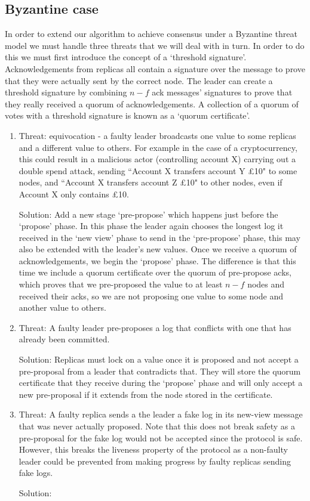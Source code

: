 \subsection{Byzantine case}
In order to extend our algorithm to achieve consensus under a Byzantine threat model we must handle three threats that we will deal with in turn. In order to do this we must first introduce the concept of a `threshold signature'. Acknowledgements from replicas all contain a signature over the message to prove that they were actually sent by the correct node. The leader can create a threshold signature by combining $n - f $ ack messages' signatures to prove that they really received a quorum of acknowledgements. A collection of a quorum of votes with a threshold signature is known as a `quorum certificate'.

\begin{enumerate}
\item Threat: equivocation - a faulty leader broadcasts one value to some replicas and a different value to others. For example in the case of a cryptocurrency, this could result in a malicious actor (controlling account X) carrying out a double spend attack, sending ``Account X transfers account Y £10" to some nodes, and ``Account X transfers account Z £10" to other nodes, even if Account X only contains £10.

Solution: Add a new stage `pre-propose' which happens just before the `propose' phase. In this phase the leader again chooses the longest log it received in the `new view' phase to send in the `pre-propose' phase, this may also be extended with the leader's new values. Once we receive a quorum of acknowledgements, we begin the `propose' phase. The difference is that this time we include a quorum certificate over the quorum of pre-propose acks, which proves that we pre-proposed the value to at least $n - f$ nodes and received their acks, so we are not proposing one value to some node and another value to others.

\item Threat: A faulty leader pre-proposes a log that conflicts with one that has already been committed.

Solution: Replicas must lock on a value once it is proposed and not accept a pre-proposal from a leader that contradicts that. They will store the quorum certificate that they receive during the `propose' phase and will only accept a new pre-proposal if it extends from the node stored in the certificate.

\item Threat: A faulty replica sends a the leader a fake log in its new-view message that was never actually proposed. Note that this does not break safety as a pre-proposal for the fake log would not be accepted since the protocol is safe. However, this breaks the liveness property of the protocol as a non-faulty leader could be prevented from making progress by faulty replicas sending fake logs.

Solution: 

\end{enumerate}


